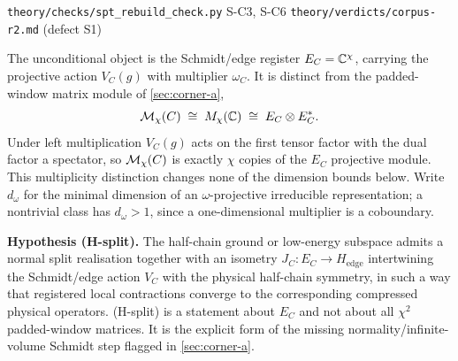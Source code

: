 %
{\texttt{theory/checks/spt\_rebuild\_check.py} S-C3, S-C6}%
{\texttt{theory/verdicts/corpus-r2.md} (defect S1)}

\begin{definition}\label{def:endpoint-module}
The unconditional object is the Schmidt/edge register $E_C=\mathbb{C}^{\chi}$,
carrying the projective action $V_C(g)$ with multiplier $\omega_C$. It is
distinct from the padded-window matrix module of \cref{sec:corner-a},
\begin{equation}
  \mathcal{M}_\chi(C)\;\cong\;M_\chi(\mathbb{C})\;\cong\;E_C\otimes E_C^{*}.
  \label{eq:spt-padded-module}
\end{equation}
Under left multiplication $V_C(g)$ acts on the first tensor factor with the
dual factor a spectator, so $\mathcal{M}_\chi(C)$ is exactly $\chi$ copies of the
$E_C$ projective module. This multiplicity distinction changes none of the
dimension bounds below. Write $d_\omega$ for the minimal dimension of an
$\omega$-projective irreducible representation; a nontrivial class has
$d_\omega>1$, since a one-dimensional multiplier is a coboundary.

\smallskip
\noindent\textbf{Hypothesis (H-split).} The half-chain ground or low-energy
subspace admits a normal split realisation together with an isometry
$J_C:E_C\to H_{\mathrm{edge}}$ intertwining the Schmidt/edge action $V_C$ with
the physical half-chain symmetry, in such a way that registered local
contractions converge to the corresponding compressed physical operators.
(H-split) is a statement about $E_C$ and not about all $\chi^{2}$
padded-window matrices. It is the explicit form of the missing
normality/infinite-volume Schmidt step flagged in \cref{sec:corner-a}.


\end{definition}
